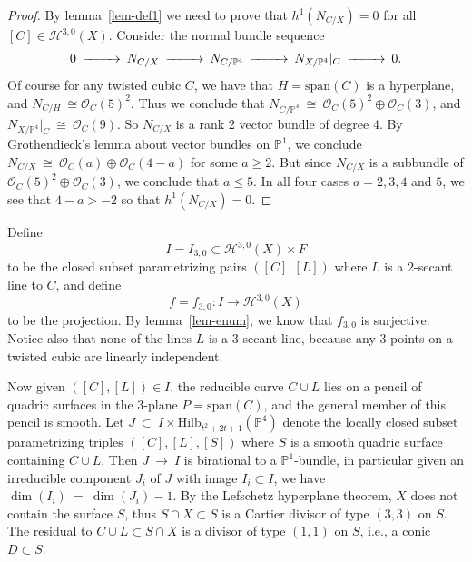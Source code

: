 \documentclass[twoside,12pt,reqno]{amsart}
\theoremstyle{plain}
\theoremstyle{definition}
\newcommand{\Hdg}[2]{\mathcal{H}^{#1,#2}}
\newcommand{\PP}{\mathbb{P}}
\newcommand{\Hi}[1]{\text{Hilb}_{#1}}
\def\ps{\vspace{4pt}}
\newcommand{\OO}{\mathcal O}
\begin{document}
\begin{proof}
By lemma~\ref{lem-def1} we need to prove that $h^1(N_{C/X})=0$ for all 
$[C]\in\Hdg{3}{0}(X)$.  Consider the normal bundle sequence
\begin{equation}
\begin{CD}
0 @>>> N_{C/X} @>>> N_{C/\PP^4} @>>> N_{X/\PP^4}|_C @>>> 0.
\end{CD}
\end{equation}
Of course for any twisted cubic $C$, we have that $H=\text{span}(C)$
is a hyperplane, and $N_{C/H}~\cong\OO_C(5)^2$.  Thus we conclude
that $N_{C/\PP^4}~\cong~\OO_C(5)^2\oplus\OO_C(3)$,  and
$N_{X/\PP^4}|_C~\cong~ \OO_C(9)$.  So $N_{C/X}$ is a rank 2 vector
bundle of degree $4$.  By Grothendieck's lemma about vector bundles on 
$\PP^1$, we conclude $N_{C/X}~\cong~\OO_C(a)\oplus\OO_C(4-a)$ for some 
$a\geq 2$.  But since $N_{C/X}$ is a subbundle of
$\OO_C(5)^2\oplus\OO_C(3)$, we conclude that $a\leq 5$.  In all four
cases $a=2,3,4$ and $5$, we see that $4-a> -2$ so that
$h^1(N_{C/X})=0$.
\end{proof}


Define 
\begin{equation}
I=I_{3,0}\subset \Hdg{3}{0}(X)\times F
\end{equation}
to be the closed subset parametrizing pairs $([C],[L])$ where $L$ is a
$2$-secant line to 
$C$, and define 
\begin{equation}
f=f_{3,0}:I\rightarrow \Hdg{3}{0}(X)
\end{equation}
to be the projection.  
By lemma~\ref{lem-enum}, we know that $f_{3,0}$ is surjective.
Notice also that none of the lines $L$ is  
a $3$-secant line, because any $3$ points on a twisted cubic are
linearly independent.  

\ps

Now given $([C],[L])\in I$, the reducible curve $C\cup L$ lies on a
pencil of quadric surfaces in the $3$-plane $P=\text{span}(C)$, and
the general member of this pencil is smooth.  Let
$J~\subset~ I\times \Hi{t^2+2t+1}(\PP^4)$ denote the locally closed
subset parametrizing triples $([C],[L],[S])$ where $S$ is a smooth
quadric surface containing $C\cup L$.  Then $J~\rightarrow~ I$ is
birational to a $\PP^1$-bundle, in particular given an irreducible
component $J_i$ of $J$ with image $I_i\subset I$, we have
$\dim (I_i)~=~\dim (J_i)-1$.  
By the Lefschetz hyperplane
theorem, $X$ does not contain the surface $S$, thus
$S\cap X\subset S$ is a Cartier divisor of type $(3,3)$ on $S$.  The
residual to $C\cup L\subset S\cap X$ is a divisor of type $(1,1)$ on
$S$, i.e., a conic $D\subset S$.  
\end{document}
